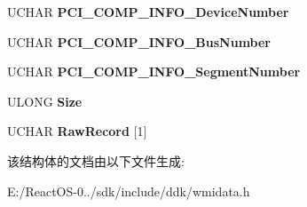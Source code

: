 \begin{DoxyCompactItemize}
U\+C\+H\+AR {\bfseries P\+C\+I\+\_\+\+C\+O\+M\+P\+\_\+\+I\+N\+F\+O\+\_\+\+Device\+Number}
\item 
\mbox{\label{struct___m_s_m_c_a_event___p_c_i_component_error_a04ad8e81dda116f7ffabf377f7c219ef}} 
U\+C\+H\+AR {\bfseries P\+C\+I\+\_\+\+C\+O\+M\+P\+\_\+\+I\+N\+F\+O\+\_\+\+Bus\+Number}
\item 
\mbox{\label{struct___m_s_m_c_a_event___p_c_i_component_error_a389a38f4f0acfcedf84204c8a7c3d26a}} 
U\+C\+H\+AR {\bfseries P\+C\+I\+\_\+\+C\+O\+M\+P\+\_\+\+I\+N\+F\+O\+\_\+\+Segment\+Number}
\item 
\mbox{\label{struct___m_s_m_c_a_event___p_c_i_component_error_af3a2e5e5a022e5f04ed3780a74eea82b}} 
U\+L\+O\+NG {\bfseries Size}
\item 
\mbox{\label{struct___m_s_m_c_a_event___p_c_i_component_error_ae7730fa1ff25ff1cb0096a29baec96be}} 
U\+C\+H\+AR {\bfseries Raw\+Record} \mbox{[}1\mbox{]}
\end{DoxyCompactItemize}


该结构体的文档由以下文件生成\+:\begin{DoxyCompactItemize}
\item 
E\+:/\+React\+O\+S-\/0../sdk/include/ddk/wmidata.\+h\end{DoxyCompactItemize}
